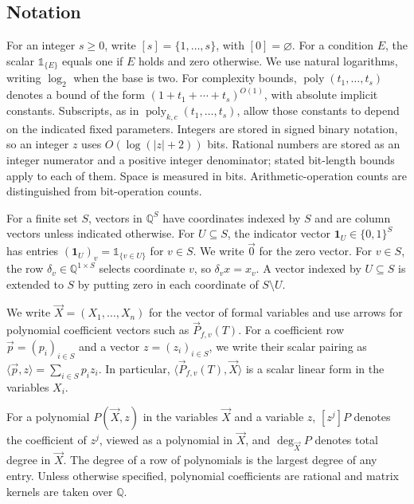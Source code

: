 \documentclass[11pt,reqno]{amsart}
\numberwithin{equation}{section}
\theoremstyle{definition}\newtheorem{definition}[theorem]{Definition}
\theoremstyle{remark}\newtheorem{remark}[theorem]{Remark}
\newcommand{\poly}{\operatorname{poly}}
\renewcommand{\ge}{\geqslant}
\begin{document}
\subsection{Notation}\label{subsec:notation}
For an integer $s\ge0$, write $[s]=\{1,\ldots,s\}$, with
$[0]=\varnothing$. For a condition $E$, the scalar
$\mathds{1}_{\{E\}}$ equals one if $E$ holds and zero otherwise.
We use natural logarithms, writing $\log_2$ when the base is two.
For complexity bounds, $\poly(t_1,\ldots,t_s)$ denotes a bound of the
form $(1+t_1+\cdots+t_s)^{O(1)}$, with absolute implicit constants.
Subscripts, as in $\poly_{k,c}(t_1,\ldots,t_s)$, allow those constants
to depend on the indicated fixed parameters. Integers are stored in
signed binary notation, so an integer $z$ uses $O(\log(|z|+2))$ bits.
Rational numbers are stored as an integer numerator and a positive
integer denominator; stated bit-length bounds apply to each of them.
Space is measured in bits. Arithmetic-operation counts are distinguished
from bit-operation counts.

For a finite set $S$, vectors in $\mathbb Q^S$ have coordinates
indexed by $S$ and are column vectors unless indicated otherwise.
For $U\subseteq S$, the indicator vector $\mathbf1_U\in\{0,1\}^S$
has entries $(\mathbf1_U)_v=\mathds{1}_{\{v\in U\}}$ for $v\in S$.
We write $\vec{0}$ for the zero vector. For $v\in S$, the row
$\delta_v\in\mathbb Q^{1\times S}$ selects coordinate $v$, so
$\delta_vx=x_v$. A vector indexed by $U\subseteq S$ is extended
to $S$ by putting zero in each coordinate of $S\setminus U$.

We write $\vec{X}=(X_1,\ldots,X_n)$ for the vector of formal variables
and use arrows for polynomial coefficient vectors such as
$\vec{P}_{f,v}(T)$. For a coefficient row $\vec{p}=(p_i)_{i\in S}$
and a vector $z=(z_i)_{i\in S}$, we write their scalar pairing as
$\langle\vec{p},z\rangle=\sum_{i\in S}p_i z_i$.
In particular, $\langle\vec{P}_{f,v}(T),\vec{X}\rangle$ is a
scalar linear form in the variables $X_i$.

For a polynomial $P(\vec{X},z)$ in the variables $\vec{X}$ and a variable $z$,
$[z^j]P$ denotes the coefficient of $z^j$, viewed as a polynomial
in $\vec{X}$, and $\deg_{\vec{X}} P$ denotes total degree in $\vec{X}$.
The degree of a row of polynomials is the largest
degree of any entry. Unless otherwise specified, polynomial
coefficients are rational and matrix kernels are taken over
$\mathbb Q$.
\end{document}
